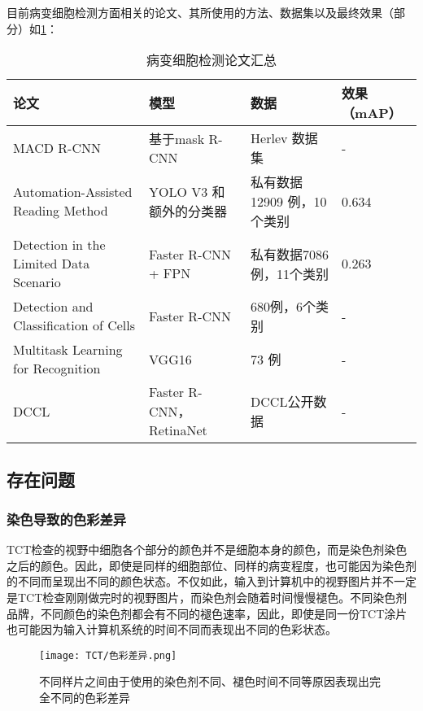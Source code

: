 \par 目前病变细胞检测方面相关的论文、其所使用的方法、数据集以及最终效果（部分）如\ref{检测论文}：
\begin{table}[htbp]
    \center
    \caption{病变细胞检测论文汇总}
    \begin{tabular}{|p{4cm}|p{4cm}|p{3cm}|p{1cm}|}
        \hline
        论文                                                             & 模型                    & 数据                       & 效果（mAP） \\     \hline
        MACD R-CNN\cite{ma2020macd}                                      & 基于mask R-CNN          & Herlev 数据集              & -           \\ \hline
        Automation-Assisted Reading Method\cite{xiang2020novel}          & YOLO V3 和额外的分类器  & 私有数据12909 例，10个类别 & 0.634       \\ \hline
        Detection in the Limited Data Scenario\cite{liang2018comparison} & Faster R-CNN + FPN      & 私有数据7086例，11个类别   & 0.263       \\ \hline
        Detection and Classification of Cells\cite{li2019detection}      & Faster R-CNN            & 680例，6个类别             & -           \\ \hline
        Multitask Learning for Recognition\cite{liu2018multitask}        & VGG16                   & 73 例                      & -           \\ \hline
        DCCL\cite{zhang2019dccl}                                         & Faster R-CNN，RetinaNet & DCCL公开数据               & -           \\ \hline
    \end{tabular}
    \label{检测论文}
\end{table}

\subsection{存在问题}
\subsubsection{染色导致的色彩差异}
\par TCT检查的视野中细胞各个部分的颜色并不是细胞本身的颜色，而是染色剂染色之后的颜色。因此，即使是同样的细胞部位、同样的病变程度，也可能因为染色剂的不同而呈现出不同的颜色状态。不仅如此，输入到计算机中的视野图片并不一定是TCT检查刚刚做完时的视野图片，而染色剂会随着时间慢慢褪色。不同染色剂品牌，不同颜色的染色剂都会有不同的褪色速率，因此，即使是同一份TCT涂片也可能因为输入计算机系统的时间不同而表现出不同的色彩状态。
\begin{figure}[h]
    \centering
    \texttt{[image: TCT/色彩差异.png]}
    \caption{不同样片之间由于使用的染色剂不同、褪色时间不同等原因表现出完全不同的色彩差异}
    \label{色彩差异}
\end{figure}
